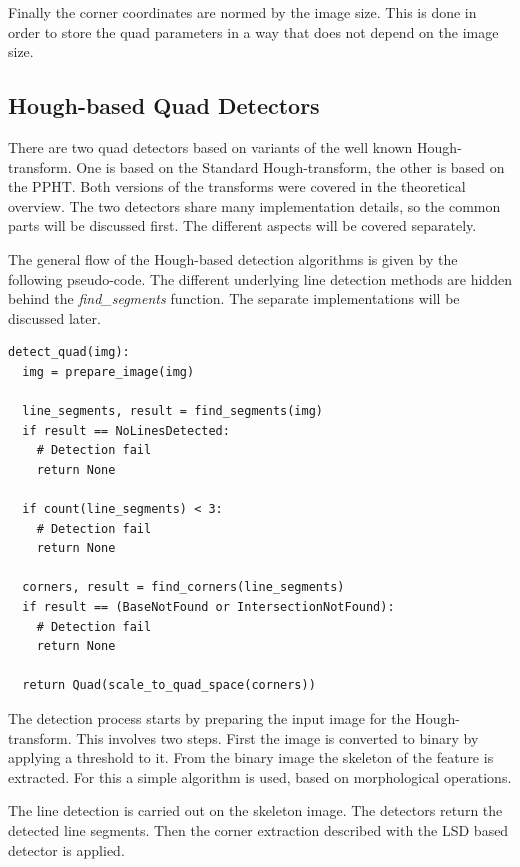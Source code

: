 Finally the corner coordinates are normed by the image size.
This is done in order to store the quad parameters in a way that does not depend on the image size.

\subsection{Hough-based Quad Detectors}

There are two quad detectors based on variants of the well known Hough-transform.
One is based on the Standard Hough-transform, the other is based on the PPHT.
Both versions of the transforms were covered in the theoretical overview.
The two detectors share many implementation details, so the common parts will be discussed first.
The different aspects will be covered separately.

The general flow of the Hough-based detection algorithms is given by the following pseudo-code.
The different underlying line detection methods are hidden behind the \textit{find\_segments} function.
The separate implementations will be discussed later.
\begin{lstlisting}
detect_quad(img):
  img = prepare_image(img)
	
  line_segments, result = find_segments(img)
  if result == NoLinesDetected:
    # Detection fail
    return None
	
  if count(line_segments) < 3:
    # Detection fail
    return None
	
  corners, result = find_corners(line_segments)
  if result == (BaseNotFound or IntersectionNotFound):
    # Detection fail
    return None
	
  return Quad(scale_to_quad_space(corners))	
\end{lstlisting}

The detection process starts by preparing the input image for the Hough-transform.
This involves two steps.
First the image is converted to binary by applying a threshold to it.
From the binary image the skeleton of the feature is extracted.
For this a simple algorithm is used, based on morphological operations.

The line detection is carried out on the skeleton image.
The detectors return the detected line segments.
Then the corner extraction described with the LSD based detector is applied.

